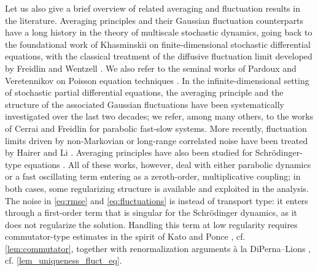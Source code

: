 \documentclass[a4paper,10pt]{amsart}
\theoremstyle{remark}
\numberwithin{equation}{section}
\begin{document}
Let us also give a brief overview of related averaging and fluctuation results in the literature. Averaging principles and their Gaussian fluctuation counterparts have a long history in the theory of multiscale stochastic dynamics, going back to the foundational work of Khasminskii \cite{khasminskii1968} on finite-dimensional stochastic differential equations, with the classical treatment of the diffusive fluctuation limit developed by Freidlin and Wentzell \cite[Chapter 7]{freidlinwentzell3}. We also refer to the seminal works of Pardoux and Veretennikov on Poisson equation techniques \cite{pardoux_1, pardoux2003poisson, pardoux_3}. In the infinite-dimensional setting of stochastic partial differential equations, the averaging principle and the structure of the associated Gaussian fluctuations have been systematically investigated over the last two decades; we refer, among many others, to the works of Cerrai and Freidlin \cite{cerrai1, cerrai2009normal, cerrai2009averaging, cerrai3} for parabolic fast-slow systems. More recently, fluctuation limits driven by non-Markovian or long-range correlated noise have been treated by Hairer and Li \cite{Hairer_1, li2022slow, hairer2022generating}. Averaging principles have also been studied for Schrödinger-type equations \cite{gao2017averaging, gao2018averaging}. All of these works, however, deal with either parabolic dynamics or a fast oscillating term entering as a zeroth-order, multiplicative coupling; in both cases, some regularizing structure is available and exploited in the analysis. The noise in \eqref{eq:rmse} and \eqref{eq:fluctuations} is instead of transport type: it enters through a first-order term that is singular for the Schrödinger dynamics, as it does not regularize the solution. Handling this term at low regularity requires commutator-type estimates in the spirit of Kato and Ponce \cite{kato1988commutator}, cf. \cref{lem:commutator}, together with renormalization arguments à la DiPerna–Lions \cite{diperna1989ordinary}, cf. \cref{lem_uniqueness_fluct_eq}.
\end{document}
